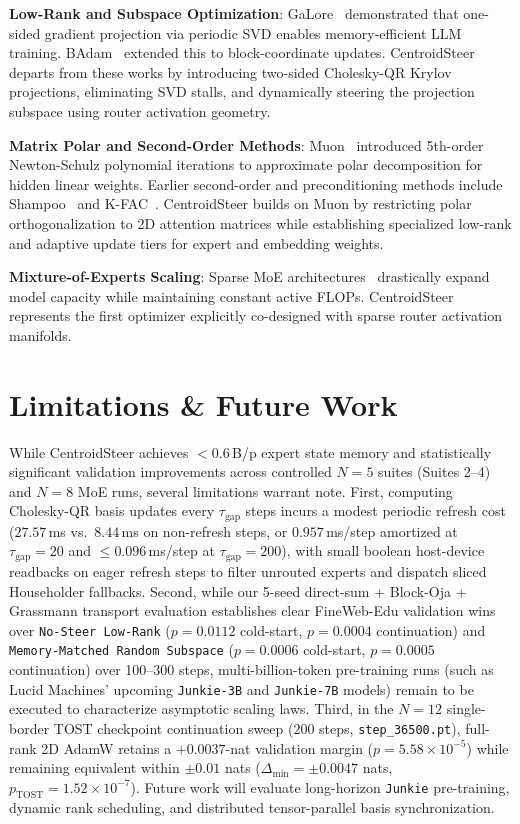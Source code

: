 \documentclass[10pt,twocolumn,letterpaper]{article}
\begin{document}
\textbf{Low-Rank and Subspace Optimization}: GaLore~\cite{zhao2024galore} demonstrated that one-sided gradient projection via periodic SVD enables memory-efficient LLM training. BAdam~\cite{liu2024badam} extended this to block-coordinate updates. CentroidSteer departs from these works by introducing two-sided Cholesky-QR Krylov projections, eliminating SVD stalls, and dynamically steering the projection subspace using router activation geometry.

\textbf{Matrix Polar and Second-Order Methods}: Muon~\cite{jordan2024muon} introduced 5th-order Newton-Schulz polynomial iterations to approximate polar decomposition for hidden linear weights. Earlier second-order and preconditioning methods include Shampoo~\cite{gupta2018shampoo,anil2020scalable} and K-FAC~\cite{martens2015optimizing}. CentroidSteer builds on Muon by restricting polar orthogonalization to 2D attention matrices while establishing specialized low-rank and adaptive update tiers for expert and embedding weights.

\textbf{Mixture-of-Experts Scaling}: Sparse MoE architectures~\cite{shazeer2017outrageously,fedus2022switch,jiang2024mixtral,deepseek2024v3} drastically expand model capacity while maintaining constant active FLOPs. CentroidSteer represents the first optimizer explicitly co-designed with sparse router activation manifolds.

\section{Limitations \& Future Work}

While CentroidSteer achieves $<0.6$\,B/p expert state memory and statistically significant validation improvements across controlled $N=5$ suites (Suites 2--4) and $N=8$ MoE runs, several limitations warrant note. First, computing Cholesky-QR basis updates every $\tau_{\text{gap}}$ steps incurs a modest periodic refresh cost ($27.57$\,ms vs.\ $8.44$\,ms on non-refresh steps, or $0.957$\,ms/step amortized at $\tau_{\text{gap}}=20$ and $\le 0.096$\,ms/step at $\tau_{\text{gap}}=200$), with small boolean host-device readbacks on eager refresh steps to filter unrouted experts and dispatch sliced Householder fallbacks. Second, while our 5-seed direct-sum + Block-Oja + Grassmann transport evaluation establishes clear FineWeb-Edu validation wins over \texttt{No-Steer Low-Rank} ($p=0.0112$ cold-start, $p=0.0004$ continuation) and \texttt{Memory-Matched Random Subspace} ($p=0.0006$ cold-start, $p=0.0005$ continuation) over 100--300 steps, multi-billion-token pre-training runs (such as Lucid Machines' upcoming \texttt{Junkie-3B} and \texttt{Junkie-7B} models) remain to be executed to characterize asymptotic scaling laws. Third, in the $N=12$ single-border TOST checkpoint continuation sweep ($200$ steps, \texttt{step\_36500.pt}), full-rank 2D AdamW retains a $+0.0037$-nat validation margin ($p = 5.58 \times 10^{-5}$) while remaining equivalent within $\pm 0.01$ nats ($\Delta_{\min} = \pm 0.0047$ nats, $p_{\text{TOST}} = 1.52 \times 10^{-7}$). Future work will evaluate long-horizon \texttt{Junkie} pre-training, dynamic rank scheduling, and distributed tensor-parallel basis synchronization.
\end{document}
